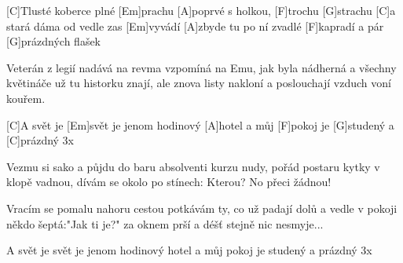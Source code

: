 
[C]Tlusté koberce plné [Em]prachu
[A]poprvé s holkou, [F]trochu [G]strachu
[C]a stará dáma od vedle zas [Em]vyvádí
[A]zbyde tu po ní zvadlé [F]kapradí
a pár [G]prázdných flašek

Veterán z legií nadává na revma
vzpomíná na Emu, jak byla nádherná
a všechny květináče už tu historku znají,
ale znova listy nakloní a poslouchají
vzduch voní kouřem.

[C]A svět je [Em]svět je jenom hodinový [A]hotel
a můj [F]pokoj je [G]studený a [C]prázdný 3x

Vezmu si sako a půjdu do baru
absolventi kurzu nudy, pořád postaru
kytky v klopě vadnou, dívám se okolo po stínech:
Kterou? No přeci žádnou!

Vracím se pomalu nahoru
cestou potkávám ty, co už padají dolů
a vedle v pokoji někdo šeptá:"Jak ti je?"
za oknem prší a déšť stejně nic nesmyje...

A svět je svět je jenom hodinový hotel
a můj pokoj je studený a prázdný 3x


